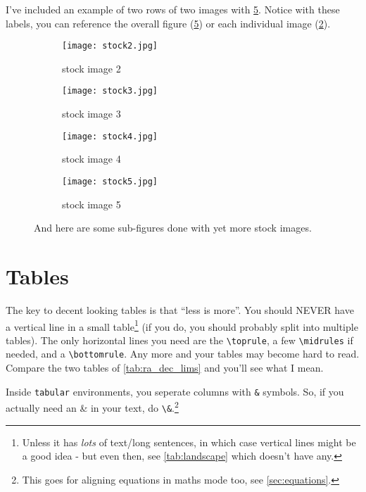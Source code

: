 \documentclass[../main]{subfiles}
\begin{document}
I've included an example of two rows of two images with \cref{fig:stock2_3_4_5}. Notice with these labels, you can reference the overall figure (\cref{fig:stock2_3_4_5}) or each individual image (\cref{fig:stock3}).   

\begin{figure}
    \centering
    \begin{subfigure}[b]{0.45\textwidth}
        \centering
        \texttt{[image: stock2.jpg]}
        \caption{stock image 2}
        \label{fig:stock2}
    \end{subfigure}
    \hfill
    \begin{subfigure}[b]{0.45\textwidth}
        \centering
        \texttt{[image: stock3.jpg]}
        \caption{stock image 3}
        \label{fig:stock3}
    \end{subfigure}
    \hfill
    \begin{subfigure}[b]{0.45\textwidth}
        \centering
        \texttt{[image: stock4.jpg]}
        \caption{stock image 4}
        \label{fig:stock4}
    \end{subfigure}
    \hfill
    \begin{subfigure}[b]{0.45\textwidth}
        \centering
        \texttt{[image: stock5.jpg]}
        \caption{stock image 5}
        \label{fig:stock5}
    \end{subfigure}
    \caption[Sub figures]{And here are some sub-figures done with yet more stock images.}
    \label{fig:stock2_3_4_5}
\end{figure}

\section{Tables}

The key to decent looking tables is that ``less is more''. You should NEVER have a vertical line in a small table\footnote{Unless it has \emph{lots} of text/long sentences, in which case vertical lines might be a good idea - but even then, see \cref{tab:landscape} which doesn't have any.} (if you do, you should probably split into multiple tables). The only horizontal lines you need are the \verb|\toprule|, a few \verb|\midrules| if needed, and a \verb|\bottomrule|. Any more and your tables may become hard to read. Compare the two tables of \cref{tab:ra_dec_lims} and you'll see what I mean.

Inside \texttt{tabular} environments, you seperate columns with \verb|&| symbols. So, if you actually need an \& in your text, do \verb|\&|.\footnote{This goes for aligning equations in maths mode too, see \ref{sec:equations}.}
\end{document}
